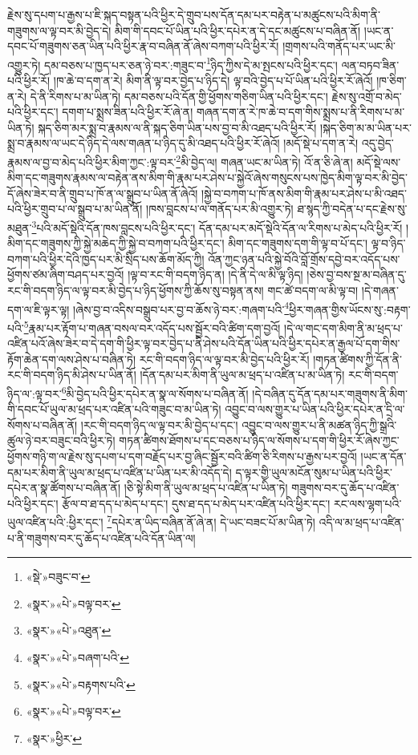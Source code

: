 རྗེས་སུ་དཔག་པ་རྒྱས་པ་ཇི་སྐད་བསྟན་པའི་ཕྱིར་དེ་གྲུབ་པས་དོན་དམ་པར་བརྟེན་པ་མཚུངས་པའི་མིག་ནི་གཟུགས་ལ་ལྟ་བར་མི་བྱེད་དེ། མིག་གི་དབང་པོ་ཡིན་པའི་ཕྱིར་དཔེར་ན་དེ་དང་མཚུངས་པ་བཞིན་ནོ། །ཡང་ན་དབང་པོ་གཟུགས་ཅན་ཡིན་པའི་ཕྱིར་རྣ་བ་བཞིན་ནོ་ཞེས་བཀག་པའི་ཕྱིར་རོ། །གྲགས་པའི་གནོད་པར་ཡང་མི་འགྱུར་ཏེ། དམ་བཅས་པ་ཁྱད་པར་ཅན་ཉེ་བར་:གཟུང་བ་\footnote{«སྡེ་»བཟུང་བ་}ཉིད་ཀྱིས་དེ་མ་སྤངས་པའི་ཕྱིར་དང་། ལན་བཏབ་ཟིན་པའི་ཕྱིར་རོ། །ཁ་ཆེ་བ་དག་ན་རེ། མིག་ནི་ལྟ་བར་བྱེད་པ་ཉིད་དེ། ལྟ་བའི་བྱེད་པ་པོ་ཡིན་པའི་ཕྱིར་རོ་ཞེའོ། །ཁ་ཅིག་ན་རེ། དེ་ནི་རིགས་པ་མ་ཡིན་ཏེ། དམ་བཅས་པའི་དོན་གྱི་ཕྱོགས་གཅིག་ཡིན་པའི་ཕྱིར་དང་། རྗེས་སུ་འགྲོ་བ་མེད་པའི་ཕྱིར་དང་། དགག་པ་སྨྲས་ཟིན་པའི་ཕྱིར་རོ་ཞེ་ན། གཞན་དག་ན་རེ་ཁ་ཆེ་བ་དག་གིས་སྨྲས་པ་ནི་རིགས་པ་མ་ཡིན་ཏེ། སྐད་ཅིག་མར་སྨྲ་བ་རྣམས་ལ་ནི་སྐད་ཅིག་ཡིན་པས་བྱ་བ་མི་འཐད་པའི་ཕྱིར་རོ། །སྐད་ཅིག་མ་མ་ཡིན་པར་སྨྲ་བ་རྣམས་ལ་ཡང་དེ་ཉིད་དེ་ལས་གཞན་པ་ཉིད་དུ་མི་འཐད་པའི་ཕྱིར་རོ་ཞེའོ། །མདོ་སྡེ་པ་དག་ན་རེ། འདུ་བྱེད་རྣམས་ལ་བྱ་བ་མེད་པའི་ཕྱིར་མིག་ཀྱང་:ལྟ་བར་\footnote{«སྣར་»«པེ་»བལྟ་བར་}མི་བྱེད་ལ། གཞན་ཡང་མ་ཡིན་ཏེ། འོ་ན་ཅི་ཞེ་ན། མདོ་སྡེ་ལས་མིག་དང་གཟུགས་རྣམས་ལ་བརྟེན་ནས་མིག་གི་རྣམ་པར་ཤེས་པ་སྐྱེའོ་ཞེས་གསུངས་པས་ཁྱེད་མིག་ལྟ་བར་མི་བྱེད་དོ་ཞེས་ཟེར་བ་ནི་གྲུབ་པ་ཁོ་ན་ལ་སྒྲུབ་པ་ཡིན་ནོ་ཞེའོ། །སྐྱེ་བ་བཀག་པ་ཁོ་ནས་མིག་གི་རྣམ་པར་ཤེས་པ་མི་འཐད་པའི་ཕྱིར་གྲུབ་པ་ལ་སྒྲུབ་པ་མ་ཡིན་ནོ། །ཁས་བླངས་པ་ལ་གནོད་པར་མི་འགྱུར་ཏེ། ཐ་སྙད་ཀྱི་བདེན་པ་དང་རྗེས་སུ་མཐུན་\footnote{«སྣར་»«པེ་»འཐུན་}པའི་མདོ་སྡེའི་དོན་ཁས་བླངས་པའི་ཕྱིར་དང་། དོན་དམ་པར་མདོ་སྡེའི་དོན་ལ་རིགས་པ་མེད་པའི་ཕྱིར་རོ། །མིག་དང་གཟུགས་ཀྱི་སྐྱེ་མཆེད་ཀྱི་སྐྱེ་བ་བཀག་པའི་ཕྱིར་དང་། མིག་དང་གཟུགས་དག་གི་ལྟ་བ་པོ་དང་། ལྟ་བ་ཉིད་བཀག་པའི་ཕྱིར་དེའི་ཁྱད་པར་མི་སྲིད་པས་ཆོག་མོད་ཀྱི། འོན་ཀྱང་ཉན་པའི་སྐྱེ་བོའི་བློ་གྲོས་དབྱེ་བར་འདོད་པས་ཕྱོགས་ཙམ་ཞིག་བཤད་པར་བྱའོ། །ལྟ་བ་རང་གི་བདག་ཉིད་ན། །དེ་ནི་དེ་ལ་མི་ལྟ་ཉིད། །ཅེས་བྱ་བས་སྔ་མ་བཞིན་དུ་རང་གི་བདག་ཉིད་ལ་ལྟ་བར་མི་བྱེད་པ་ཉིད་ཕྱོགས་ཀྱི་ཆོས་སུ་བསྟན་ནས། གང་ཚེ་བདག་ལ་མི་ལྟ་བ། །དེ་གཞན་དག་ལ་ཇི་ལྟར་ལྟ། །ཞེས་བྱ་བ་འདིས་བསྒྲུབ་པར་བྱ་བ་ཆོས་ཉེ་བར་:གཞག་པའི་\footnote{«སྣར་»«པེ་»བཞག་པའི་}ཕྱིར་གཞན་གྱིས་ཡོངས་སུ་:བརྟག་པའི་\footnote{«སྣར་»«པེ་»བརྟགས་པའི་}རྣམ་པར་རྟོག་པ་གཞན་བསལ་བར་འདོད་པས་སྦྱོར་བའི་ཚིག་དག་བྱའོ། །དེ་ལ་གང་དག་མིག་ནི་མ་ཕྲད་པ་འཛིན་པའོ་ཞེས་ཟེར་བ་དེ་དག་གི་ཕྱིར་ལྟ་བར་བྱེད་པ་ནི་ཤེས་པའི་དོན་ཡིན་པའི་ཕྱིར་དཔེར་ན་རྒྱལ་པོ་དག་གིས་རྟོག་ཆེན་དག་ལས་ཤེས་པ་བཞིན་ཏེ། རང་གི་བདག་ཉིད་ལ་ལྟ་བར་མི་བྱེད་པའི་ཕྱིར་རོ། །གཏན་ཚིགས་ཀྱི་དོན་ནི་རང་གི་བདག་ཉིད་མི་ཤེས་པ་ཡིན་ནོ། །དོན་དམ་པར་མིག་ནི་ཡུལ་མ་ཕྲད་པ་འཛིན་པ་མ་ཡིན་ཏེ། རང་གི་བདག་ཉིད་ལ་:ལྟ་བར་\footnote{«སྣར་»«པེ་»བལྟ་བར་}མི་བྱེད་པའི་ཕྱིར་དཔེར་ན་སྣ་ལ་སོགས་པ་བཞིན་ནོ། །དེ་བཞིན་དུ་དོན་དམ་པར་གཟུགས་ནི་མིག་གི་དབང་པོ་ཡུལ་མ་ཕྲད་པར་འཛིན་པའི་གཟུང་བ་མ་ཡིན་ཏེ། འབྱུང་བ་ལས་གྱུར་པ་ཡིན་པའི་ཕྱིར་དཔེར་ན་དྲི་ལ་སོགས་པ་བཞིན་ནོ། །རང་གི་བདག་ཉིད་ལ་ལྟ་བར་མི་བྱེད་པ་དང་། འབྱུང་བ་ལས་གྱུར་པ་ནི་མཚན་ཉིད་ཀྱི་སྒྲའི་ཚུལ་ཉེ་བར་བཟུང་བའི་ཕྱིར་ཏེ། གཏན་ཚིགས་ཐོགས་པ་དང་བཅས་པ་ཉིད་ལ་སོགས་པ་དག་གི་ཕྱིར་རོ་ཞེས་ཀྱང་ཕྱོགས་གཉི་ག་ལ་རྗེས་སུ་དཔག་པ་དག་བརྗོད་པར་བྱ་ཞིང་སྦྱོར་བའི་ཚིག་ཅི་རིགས་པ་རྒྱས་པར་བྱའོ། །ཡང་ན་དོན་དམ་པར་མིག་ནི་ཡུལ་མ་ཕྲད་པ་འཛིན་པ་ཡིན་པར་མི་འདོད་དེ། ད་ལྟར་གྱི་ཡུལ་མངོན་སུམ་པ་ཡིན་པའི་ཕྱིར་དཔེར་ན་སྣ་ཚོགས་པ་བཞིན་ནོ། །ཅི་སྟེ་མིག་ནི་ཡུལ་མ་ཕྲད་པ་འཛིན་པ་ཡིན་ཏེ། གཟུགས་བར་དུ་ཆོད་པ་འཛིན་པའི་ཕྱིར་དང་། རྩོལ་བ་ཐ་དད་པ་མེད་པ་དང་། དུས་ཐ་དད་པ་མེད་པར་འཛིན་པའི་ཕྱིར་དང་། རང་ལས་ལྷག་པའི་ཡུལ་འཛིན་པའི་:ཕྱིར་དང་། \footnote{«སྣར་»ཕྱིར་}དཔེར་ན་ཡིད་བཞིན་ནོ་ཞེ་ན། དེ་ཡང་བཟང་པོ་མ་ཡིན་ཏེ། འདི་ལ་མ་ཕྲད་པ་འཛིན་པ་ནི་གཟུགས་བར་དུ་ཆོད་པ་འཛིན་པའི་དོན་ཡིན་ལ། 